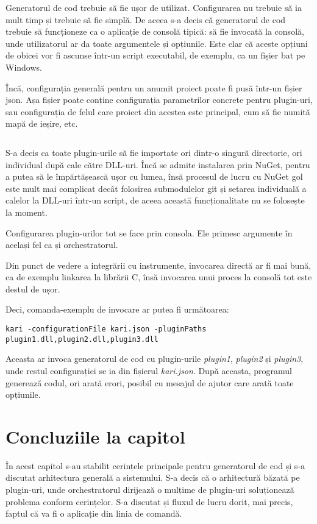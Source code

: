 \documentclass[a4paper,12pt]{report}
\newcommand\chapterConclusionSection[1]{\section{Concluziile la capitol \nameref{#1}}}
\begin{document}
Generatorul de cod trebuie să fie ușor de utilizat.
Configurarea nu trebuie să ia mult timp și trebuie să fie simplă.
De aceea s-a decis că generatorul de cod trebuie să funcționeze ca o aplicație de consolă tipică: să fie invocată la consolă, unde utilizatorul ar da toate argumentele și opțiunile.
Este clar că aceste opțiuni de obicei vor fi ascunse într-un script executabil, de exemplu, ca un fișier bat pe Windows.

Încă, configurația generală pentru un anumit proiect poate fi pusă într-un fișier json.
Așa fișier poate conține configurația parametrilor concrete pentru plugin-uri, sau configurația de felul care proiect din acestea este principal, cum să fie numită mapă de ieșire, etc.
\inputminted{js}{../race/game/kari.json}


S-a decis ca toate plugin-urile să fie importate ori dintr-o singură directorie, ori individual după cale către \ac{DLL}-uri.
Încă se admite instalarea prin NuGet, pentru a putea să le împărtășească ușor cu lumea, însă procesul de lucru cu NuGet gol este mult mai complicat decât folosirea submodulelor git și setarea individuală a calelor la \ac{DLL}-uri într-un script, de aceea această funcționalitate nu se folosește la moment.

Configurarea plugin-urilor tot se face prin consola.
Ele primesc argumente în același fel ca și orchestratorul.

Din punct de vedere a integrării cu instrumente, invocarea directă ar fi mai bună, ca de exemplu linkarea la librării C, însă invocarea unui proces la consolă tot este destul de ușor.

Deci, comanda-exemplu de invocare ar putea fi următoarea:

\begin{verbatim}
kari -configurationFile kari.json -pluginPaths plugin1.dll,plugin2.dll,plugin3.dll
\end{verbatim}

Aceasta ar invoca generatorul de cod cu plugin-urile \textit{plugin1}, \textit{plugin2} și \textit{plugin3}, unde restul configurației se ia din fișierul \textit{kari{.}json}.
După aceasta, programul generează codul, ori arată erori, posibil cu mesajul de ajutor care arată toate opțiunile.


\chapterConclusionSection{architecture_chapter_title}

În acest capitol s-au stabilit cerințele principale pentru generatorul de cod și s-a discutat arhitectura generală a sistemului.
S-a decis că o arhitectură băzată pe plugin-uri, unde orchestratorul dirijează o mulțime de plugin-uri soluționează problema conform cerințelor.
S-a discutat și fluxul de lucru dorit, mai precis, faptul că va fi o aplicație din linia de comandă.
\end{document}
